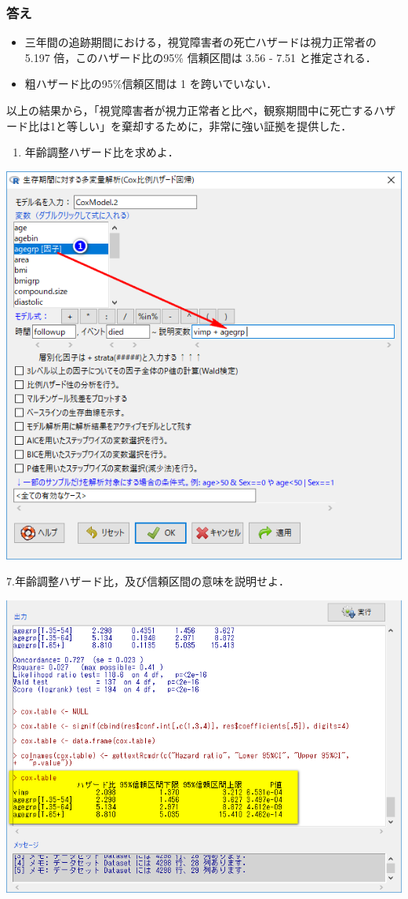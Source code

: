 \documentclass[]{problemset}
\providecommand{\tightlist}{%
  \setlength{\itemsep}{0pt}\setlength{\parskip}{0pt}}
\begin{document}
\hypertarget{-8}{%
\subsubsection{答え}\label{-8}}

\begin{itemize}
\item
  三年間の追跡期間における，視覚障害者の死亡ハザードは視力正常者の 5.197
  倍，このハザード比の95\% 信頼区間は 3.56 - 7.51 と推定される．
\item
  粗ハザード比の95\%信頼区間は 1 を跨いでいない．
\end{itemize}

以上の結果から，「視覚障害者が視力正常者と比べ，観察期間中に死亡するハザード比は1と等しい」を棄却するために，非常に強い証拠を提供した．

\begin{enumerate}
\def\labelenumi{\arabic{enumi}.}
\setcounter{enumi}{5}
\tightlist
\item
  年齢調整ハザード比を求めよ．
\end{enumerate}

\begin{center}\includegraphics[width=0.6\linewidth,height=0.4\textheight]{pic/survival18} \end{center}

7.年齢調整ハザード比，及び信頼区間の意味を説明せよ．

\begin{center}\includegraphics[width=0.6\linewidth,height=0.4\textheight]{pic/survival19} \end{center}
\end{document}
